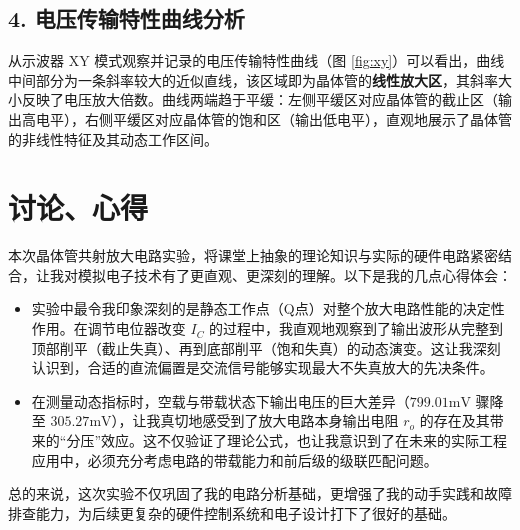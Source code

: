 ﻿\documentclass[10.5pt]{config}
\begin{document}
\subsection*{4. 电压传输特性曲线分析}
从示波器 XY 模式观察并记录的电压传输特性曲线（图 \ref{fig:xy}）可以看出，曲线中间部分为一条斜率较大的近似直线，该区域即为晶体管的\textbf{线性放大区}，其斜率大小反映了电压放大倍数。曲线两端趋于平缓：左侧平缓区对应晶体管的截止区（输出高电平），右侧平缓区对应晶体管的饱和区（输出低电平），直观地展示了晶体管的非线性特征及其动态工作区间。


\section{讨论、心得}

本次晶体管共射放大电路实验，将课堂上抽象的理论知识与实际的硬件电路紧密结合，让我对模拟电子技术有了更直观、更深刻的理解。以下是我的几点心得体会：

\begin{itemize}[leftmargin=2em]
    \item 实验中最令我印象深刻的是静态工作点（Q点）对整个放大电路性能的决定性作用。在调节电位器改变 $I_C$ 的过程中，我直观地观察到了输出波形从完整到顶部削平（截止失真）、再到底部削平（饱和失真）的动态演变。这让我深刻认识到，合适的直流偏置是交流信号能够实现最大不失真放大的先决条件。
    
    \item 在测量动态指标时，空载与带载状态下输出电压的巨大差异（$799.01\mathrm{mV}$ 骤降至 $305.27\mathrm{mV}$），让我真切地感受到了放大电路本身输出电阻 $r_o$ 的存在及其带来的“分压”效应。这不仅验证了理论公式，也让我意识到了在未来的实际工程应用中，必须充分考虑电路的带载能力和前后级的级联匹配问题。
\end{itemize}

总的来说，这次实验不仅巩固了我的电路分析基础，更增强了我的动手实践和故障排查能力，为后续更复杂的硬件控制系统和电子设计打下了很好的基础。
\end{document}
